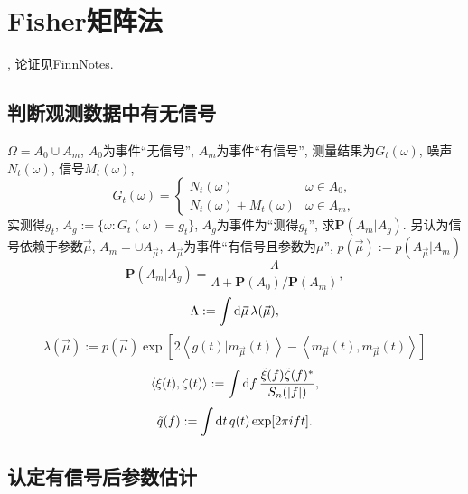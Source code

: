 \chapter{Fisher矩阵法}

\def\P{\mathbf{P} }
\cite{Finn1992}, 论证见\href{https://github.com/GasinAn/GWAstroNotes/blob/main/Finn/FinnNotes.pdf}{FinnNotes}.

\section{判断观测数据中有无信号}

$\Omega=A_0\cup A_m$, $A_0$为事件``无信号'', $A_m$为事件``有信号'', 测量结果为$G_t(\omega)$, 噪声$N_t(\omega)$, 信号$M_t(\omega)$,
\begin{equation}
    G_t(\omega)=\begin{cases}
        N_t(\omega)&\omega\in A_0,\\
        N_t(\omega)+M_t(\omega)&\omega\in A_m,
    \end{cases}
\end{equation}
实测得$g_t$, $A_g:=\{\omega:G_t(\omega)=g_t\}$, $A_g$为事件为``测得$g_t$'', 求$\P(A_m|A_g)$. 另认为信号依赖于参数$\vec{\mu}$, $A_m=\cup A_{\vec{\mu}}$, $A_{\vec{\mu}}$为事件``有信号且参数为$\mu$'', $p(\vec{\mu}):=p(A_{\vec{\mu}}|A_m)$
\begin{equation}
    \P(A_m|A_g)=\frac{\Lambda}{\Lambda+\P(A_0)/\P(A_m)},
\end{equation}
\begin{equation}
    \Lambda:=\int\mathrm{d}\vec{\mu}\,\lambda(\vec{\mu}),
\end{equation}
\begin{equation}
    \lambda(\vec{\mu}):=p(\vec{\mu})\exp[2\left\langle g(t)|m_{\vec{\mu}}(t)\right\rangle -\left\langle m_{\vec{\mu}}(t),m_{\vec{\mu}}(t)\right\rangle]
\end{equation}
\begin{equation}
    \left\langle \xi(t),\zeta(t)\right\rangle:=\int\mathrm{d} f\,\frac{\tilde{\xi}(f)\tilde{\zeta}(f)^*}{S_n(\left\lvert f\right\rvert )},
\end{equation}
\begin{equation}
    \tilde{q}(f):=\int\mathrm{d} t\,q(t)\exp[2\pi ift].
\end{equation}

\section{认定有信号后参数估计}

